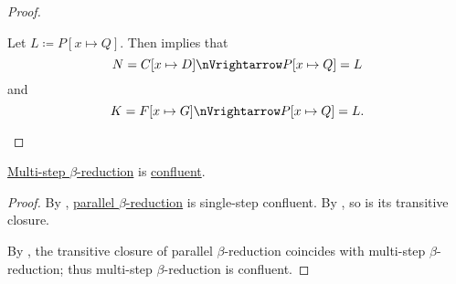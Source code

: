 \begin{proof}
\begin{itemize}
\begin{itemize}
      Let \( L \coloneqq P[x \mapsto Q] \). Then  implies that
      \begin{equation*}
        N = C[x \mapsto D] \pred P[x \mapsto Q] = L
      \end{equation*}
      and
      \begin{equation*}
        K = F[x \mapsto G] \pred P[x \mapsto Q] = L.
      \end{equation*}
    \end{itemize}
  \end{itemize}
\end{proof}

\begin{theorem}\label{thm:church_rosser_theorem_for_beta_reduction}
  \hyperref[def:beta_eta_reduction]{Multi-step \( \beta \)-reduction} is \hyperref[def:relation_confluence]{confluent}.
  \end{theorem}
\begin{proof}
  By , \hyperref[def:parallel_beta_reduction]{parallel \( \beta \)-reduction} is single-step confluent. By , so is its transitive closure.

  By , the transitive closure of parallel \( \beta \)-reduction coincides with multi-step \( \beta \)-reduction; thus multi-step \( \beta \)-reduction is confluent.
\end{proof}
